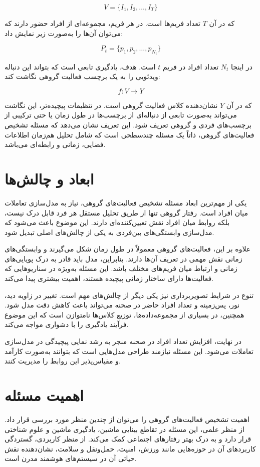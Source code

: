 \documentclass[12pt]{report}
\begin{document}
\[
V = \{I_1, I_2, \dots, I_T\}
\]

که در آن $T$ تعداد فریم‌ها است. در هر فریم، مجموعه‌ای از افراد حضور دارند که می‌توان آن‌ها را به‌صورت زیر نمایش داد:

\[
P_t = \{p_1, p_2, \dots, p_{N_t}\}
\]

در اینجا $N_t$ تعداد افراد در فریم $t$ است. هدف، یادگیری تابعی است که بتواند این دنباله ویدئویی را به یک برچسب فعالیت گروهی نگاشت کند:

\[
f: V \rightarrow Y
\]

که در آن $Y$ نشان‌دهنده کلاس فعالیت گروهی است. در تنظیمات پیچیده‌تر، این نگاشت می‌تواند به‌صورت تابعی از دنباله‌ای از برچسب‌ها در طول زمان یا حتی ترکیبی از برچسب‌های فردی و گروهی تعریف شود. این تعریف نشان می‌دهد که مسئله تشخیص فعالیت‌های گروهی، ذاتاً یک مسئله چندسطحی است که شامل تحلیل هم‌زمان اطلاعات فضایی، زمانی و رابطه‌ای می‌باشد.

\section{ابعاد و چالش‌ها}
یکی از مهم‌ترین ابعاد مسئله تشخیص فعالیت‌های گروهی، نیاز به مدل‌سازی تعاملات میان افراد است. رفتار گروهی تنها از طریق تحلیل مستقل هر فرد قابل درک نیست، بلکه روابط میان افراد نقش تعیین‌کننده‌ای دارند. این موضوع باعث می‌شود که مدل‌سازی وابستگی‌های بین‌فردی به یکی از چالش‌های اصلی تبدیل شود.

علاوه بر این، فعالیت‌های گروهی معمولاً در طول زمان شکل می‌گیرند و وابستگی‌های زمانی نقش مهمی در تعریف آن‌ها دارند. بنابراین، مدل باید قادر به درک پویایی‌های زمانی و ارتباط میان فریم‌های مختلف باشد. این مسئله به‌ویژه در سناریوهایی که فعالیت‌ها دارای ساختار زمانی پیچیده هستند، اهمیت بیشتری پیدا می‌کند.

تنوع در شرایط تصویربرداری نیز یکی دیگر از چالش‌های مهم است. تغییر در زاویه دید، نور، پس‌زمینه و تعداد افراد حاضر در صحنه می‌تواند باعث کاهش دقت مدل شود. همچنین، در بسیاری از مجموعه‌داده‌ها، توزیع کلاس‌ها نامتوازن است که این موضوع فرآیند یادگیری را با دشواری مواجه می‌کند.

در نهایت، افزایش تعداد افراد در صحنه منجر به رشد نمایی پیچیدگی در مدل‌سازی تعاملات می‌شود. این مسئله نیازمند طراحی مدل‌هایی است که بتوانند به‌صورت کارآمد و مقیاس‌پذیر این روابط را مدیریت کنند.

\section{اهمیت مسئله}
اهمیت تشخیص فعالیت‌های گروهی را می‌توان از چندین منظر مورد بررسی قرار داد. از منظر علمی، این مسئله در تقاطع بینایی ماشین، یادگیری ماشین و علوم شناختی قرار دارد و به درک بهتر رفتارهای اجتماعی کمک می‌کند. از منظر کاربردی، گستردگی کاربردهای آن در حوزه‌هایی مانند ورزش، امنیت، حمل‌ونقل و سلامت، نشان‌دهنده نقش حیاتی آن در سیستم‌های هوشمند مدرن است.
\end{document}
